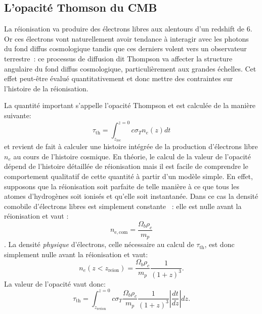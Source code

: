 \subsection{L'opacité Thomson du CMB}
La réionisation va produire des électrons libres aux alentours d'un redshift de 6. Or ces électrons vont naturellement avoir tendance à interagir avec les photons du fond diffus cosmologique tandis que ces derniers volent vers un observateur terrestre~: ce processus de diffusion dit Thompson va affecter la structure angulaire du fond diffus cosmologique, particulièrement aux grandes échelles. Cet effet peut-être évalué quantitativement et donc mettre des contraintes sur l'histoire de la réionisation.

La quantité important s'appelle l'opacité Thompson et est calculée de la manière suivante:
\begin{equation}
\tau_\mathrm{th}=\int_{z_\mathrm{rec}}^{z=0} c \sigma_T n_e(z) dt
\end{equation}
et revient de fait à calculer une histoire intégrée de la production d'électrons libre $n_e$ au cours de l'histoire cosmique. En théorie, le calcul de la valeur de l'opacité dépend de l'histoire détaillée de réionisation mais il est facile de comprendre le comportement qualitatif de cette quantité à partir d'un modèle simple. En effet, supposons que la réionisation soit parfaite de telle manière à ce que tous les atomes d'hydrogènes soit ionisés et qu'elle soit instantanée. Dans ce cas la densité comobile d'électrons libres est simplement constante ~: elle est nulle avant la réionisation et vaut :
\begin{equation}
n_\mathrm{e,com}=\frac{\Omega_b \rho_c}{m_p}
\end{equation}.
La densité \textit{physique} d'électrons, celle nécessaire au calcul de $\tau_\mathrm{th}$, est donc simplement nulle avant la réionisation et vaut:
\begin{equation}
n_e(z<z_\mathrm{reion})=\frac{\Omega_b \rho_c}{m_p} \frac{1}{(1+z)^3}.
\end{equation}
La valeur de l'opacité vaut donc:
\begin{equation}
\tau_\mathrm{th}=\int_{z_\mathrm{rerion}}^{z=0} c \sigma_T\frac{\Omega_b \rho_c}{m_p} \frac{1}{(1+z)^3}  |\frac{dt}{dz}| dz.
\end{equation}

